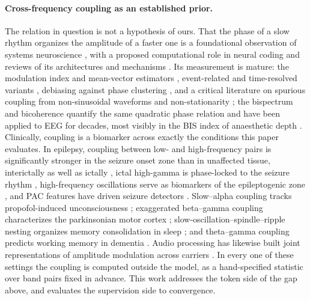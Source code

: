 \paragraph{Cross-frequency coupling as an established prior.}
The relation in question is not a hypothesis of ours. That the phase of a
slow rhythm organizes the amplitude of a faster one is a foundational
observation of systems neuroscience \citep{jensen2007cross,canolty2006high},
with a proposed computational role in neural coding \citep{lisman2013theta}
and reviews of its architectures and mechanisms
\citep{canolty2010functional,hyafil2015neural}. Its measurement is mature:
the modulation index \citep{tort2010measuring} and mean-vector estimators
\citep{canolty2006high}, event-related and time-resolved variants
\citep{voytek2013method}, debiasing against phase clustering
\citep{vandriel2015phase}, and a critical literature on spurious coupling
from non-sinusoidal waveforms and non-stationarity
\citep{aru2015untangling,cole2017brain}; the bispectrum and bicoherence
quantify the same quadratic phase relation and have been applied to EEG for
decades, most visibly in the BIS index of anaesthetic depth
\citep{sigl1994introduction,rampil1998primer}. Clinically, coupling is a
biomarker across exactly the conditions this paper evaluates. In epilepsy,
coupling between low- and high-frequency pairs is significantly stronger
in the seizure onset zone than in unaffected tissue, interictally as well
as ictally \citep{amiri2016phase}, ictal high-gamma is phase-locked to the
seizure rhythm \citep{weiss2013ictal}, high-frequency oscillations serve as
biomarkers of the epileptogenic zone \citep{jacobs2012high,zijlmans2012high},
and PAC features have driven seizure detectors \citep{edakawa2016detection}.
Slow--alpha coupling tracks propofol-induced unconsciousness
\citep{purdon2013electroencephalogram}; exaggerated beta--gamma coupling
characterizes the parkinsonian motor cortex
\citep{dehemptinne2013exaggerated}; slow-oscillation--spindle--ripple
nesting organizes memory consolidation in sleep
\citep{staresina2015hierarchical}; and theta--gamma coupling predicts
working memory in dementia \citep{goodman2018theta}. Audio processing has
likewise built joint representations of amplitude modulation across
carriers \citep{singh2003modulation}. In every one of these settings the
coupling is computed outside the model, as a hand-specified statistic over
band pairs fixed in advance. This work addresses the token side of
the gap above, and evaluates the supervision side to convergence.

